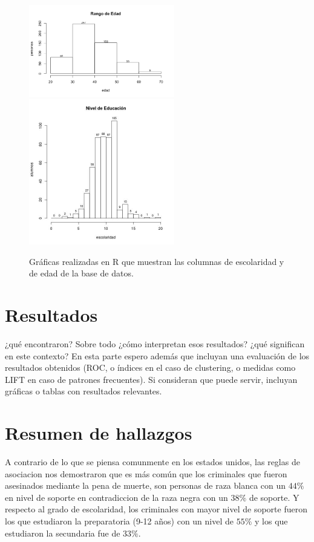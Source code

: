 \documentclass[sigconf]{acmart}
\begin{document}
\begin{figure}[ht]
  \centering
  \includegraphics[width=2.5in]{Rplot.png}
  \includegraphics[width=2.5in]{escolaridad.jpg}
  \caption{Gráficas realizadas en R que muestran las columnas de escolaridad y de edad de la base de datos.}
\end{figure}


\section{Resultados}
¿qué encontraron? Sobre todo ¿cómo interpretan esos resultados? ¿qué significan en este contexto?  En esta parte espero además que incluyan una evaluación de los resultados obtenidos (ROC, o índices en el caso de clustering, o medidas como LIFT en caso de patrones frecuentes).  Si consideran que puede servir, incluyan gráficas o tablas con resultados relevantes. 

\section{Resumen de hallazgos}
A contrario de lo que se piensa comunmente en los estados unidos, las reglas de asociacion nos demostraron que es más común que los criminales que fueron asesinados mediante la pena de muerte, son personas de raza blanca con un $44\%$ en nivel de soporte en contradiccion de la raza negra con un $38\%$ de soporte. Y respecto al grado de escolaridad, los criminales con mayor nivel de soporte fueron los que estudiaron la preparatoria (9-12 años) con un nivel de $55\%$ y los que estudiaron la secundaria fue de $33\%$. 
\end{document}

